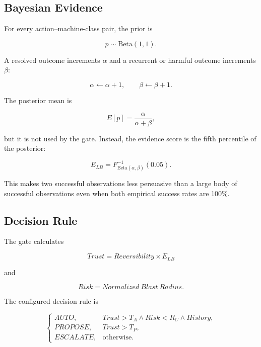 \documentclass[conference]{IEEEtran}
\begin{document}
\subsection{Bayesian Evidence}
For every action--machine-class pair, the prior is

\begin{equation}
p \sim \mathrm{Beta}(1,1).
\end{equation}

A resolved outcome increments $\alpha$ and a recurrent or harmful outcome
increments $\beta$:

\begin{equation}
\alpha \leftarrow \alpha + 1,
\qquad
\beta \leftarrow \beta + 1.
\end{equation}

The posterior mean is

\begin{equation}
E[p] = \frac{\alpha}{\alpha+\beta},
\end{equation}

but it is not used by the gate. Instead, the evidence score is the fifth
percentile of the posterior:

\begin{equation}
E_{LB}=F^{-1}_{\mathrm{Beta}(\alpha,\beta)}(0.05).
\end{equation}

This makes two successful observations less persuasive than a large body of
successful observations even when both empirical success rates are 100\%.

\subsection{Decision Rule}
The gate calculates

\begin{equation}
Trust = Reversibility \times E_{LB}
\end{equation}

and

\begin{equation}
Risk = Normalized\ Blast\ Radius.
\end{equation}

The configured decision rule is

\begin{equation}
\begin{cases}
AUTO, & Trust>T_A \land Risk<R_C \land History,\\
PROPOSE, & Trust>T_P,\\
ESCALATE, & \text{otherwise}.
\end{cases}
\end{equation}
\end{document}
